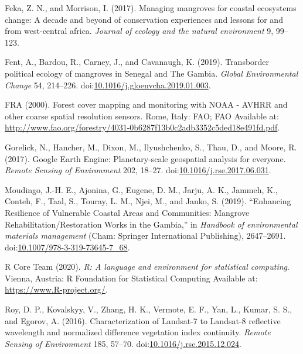 \documentclass[utf8]{frontiersSCNS}
\newlength{\cslhangindent}
\newlength{\cslentryspacingunit} %
\newenvironment{CSLReferences}[2] %
 {%
  \setlength{\parindent}{0pt}
  \ifodd #1
  \let\oldpar\par
  \def\par{\hangindent=\cslhangindent\oldpar}
  \fi
  \setlength{\parskip}{#2\cslentryspacingunit}
 }%
 {}
\begin{document}
\begin{CSLReferences}{1}{0}
\leavevmode\hypertarget{ref-Feka-and-Morrison-2017}{}%
Feka, Z. N., and Morrison, I. (2017). Managing mangroves for coastal
ecosystems change: A decade and beyond of conservation experiences and
lessons for and from west-central africa. \emph{Journal of ecology and
the natural environment} 9, 99--123.

\leavevmode\hypertarget{ref-Fent-et-al-2019}{}%
Fent, A., Bardou, R., Carney, J., and Cavanaugh, K. (2019). {Transborder
political ecology of mangroves in Senegal and The Gambia}. \emph{Global
Environmental Change} 54, 214--226.
doi:\href{https://doi.org/10.1016/j.gloenvcha.2019.01.003}{10.1016/j.gloenvcha.2019.01.003}.

\leavevmode\hypertarget{ref-FRA-2000}{}%
FRA (2000). {Forest cover mapping and monitoring with NOAA - AVHRR and
other coarse spatial resolution sensors}. Rome, Italy: FAO; FAO
Available at:
\url{http://www.fao.org/forestry/4031-0b6287f13b0c2adb3352c5ded18e491fd.pdf}.

\leavevmode\hypertarget{ref-Gorelick-et-al-2017}{}%
Gorelick, N., Hancher, M., Dixon, M., Ilyushchenko, S., Thau, D., and
Moore, R. (2017). {Google Earth Engine: Planetary-scale geospatial
analysis for everyone}. \emph{Remote Sensing of Environment} 202,
18--27.
doi:\href{https://doi.org/10.1016/j.rse.2017.06.031}{10.1016/j.rse.2017.06.031}.

\leavevmode\hypertarget{ref-Moudingo-et-al-2019}{}%
Moudingo, J.-H. E., Ajonina, G., Eugene, D. M., Jarju, A. K., Jammeh,
K., Conteh, F., Taal, S., Touray, L. M., Njei, M., and Janko, S. (2019).
{``{Enhancing Resilience of Vulnerable Coastal Areas and Communities:
Mangrove Rehabilitation/Restoration Works in the Gambia},''} in
\emph{Handbook of environmental materials management} (Cham: Springer
International Publishing), 2647--2691.
doi:\href{https://doi.org/10.1007/978-3-319-73645-7_68}{10.1007/978-3-319-73645-7\_68}.

\leavevmode\hypertarget{ref-R-Core-Team-2020}{}%
R Core Team (2020). \emph{R: A language and environment for statistical
computing}. Vienna, Austria: R Foundation for Statistical Computing
Available at: \url{https://www.R-project.org/}.

\leavevmode\hypertarget{ref-Roy-et-al-2016}{}%
Roy, D. P., Kovalskyy, V., Zhang, H. K., Vermote, E. F., Yan, L., Kumar,
S. S., and Egorov, A. (2016). {Characterization of Landsat-7 to
Landsat-8 reflective wavelength and normalized difference vegetation
index continuity}. \emph{Remote Sensing of Environment} 185, 57--70.
doi:\href{https://doi.org/10.1016/j.rse.2015.12.024}{10.1016/j.rse.2015.12.024}.


\end{CSLReferences}
\end{document}
